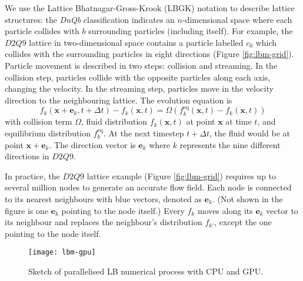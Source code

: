 \documentclass[10pt]{iopart}
\begin{document}
We use the Lattice Bhatnagar-Gross-Krook (LBGK) notation to describe lattice structures: the \textit{DnQb} classification indicates an $n$-dimensional space where each particle collides with $b$ surrounding particles (including itself). For example, the $D2Q9$ lattice in two-dimensional space contains a particle labelled $c_0$ which collides with the surrounding particles in eight directions (Figure \ref{fig:lbm-grid}). Particle movement is described in two steps: collision and streaming. In the collision step, particles collide with the opposite particles along each axis, changing the velocity. In the streaming step, particles move in the velocity direction to the neighbouring lattice. The evolution equation is
\begin{equation}\label{eq:lbm}
f_k(\mathbf{x}+\mathbf{e}_k, t+\Delta t) - f_k(\mathbf{x}, t) = 
\Omega(f_k^\text{eq}(\mathbf{x}, t) - f_k(\mathbf{x}, t))
\end{equation}
with collision term $\Omega$, fluid distribution $f_k(\mathbf{x}, t)$ at point $\mathbf{x}$ at time $t$, and equilibrium distribution $f_k^\text{eq}$. At the next timestep $t+\Delta t$, the fluid would be at point $\mathbf{x}+\mathbf{e}_k$. The direction vector is $\mathbf{e}_k$ where $k$ represents the nine different directions in $D2Q9$. 

In practice, the $D2Q9$ lattice example (Figure \ref{fig:lbm-grid}) requires up to several million nodes to generate an accurate flow field. Each node is connected to its nearest neighbours with blue vectors, denoted as $\mathbf{e}_k$. (Not shown in the figure is one $\mathbf{e}_k$ pointing to the node itself.) Every $f_k$ moves along its $\mathbf{e}_k$ vector to its neighbour and replaces the neighbour's distribution $f_{k'}$, except the one pointing to the node itself.

\begin{figure*}[ht!]
\centering
\texttt{[image: lbm-gpu]}
\caption{Sketch of parallelised LB numerical process with CPU and GPU.}
\label{fig:lbm-gpu}
\end{figure*}
\end{document}
